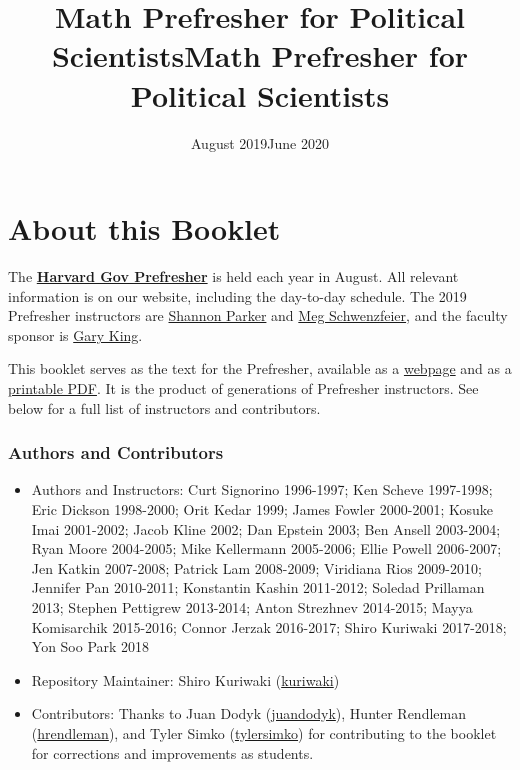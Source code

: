 \documentclass[]{book}
\title{Math Prefresher for Political Scientists}
\author{}
\date{August 2019}
\title{Math Prefresher for Political Scientists}
\author{}
\date{\vspace{-2.5em}June 2020}
\providecommand{\tightlist}{%
  \setlength{\itemsep}{0pt}\setlength{\parskip}{0pt}}
\theoremstyle{definition}
\theoremstyle{definition}
\theoremstyle{definition}
\theoremstyle{remark}
\begin{document}
\maketitle

{
\setcounter{tocdepth}{1}
\tableofcontents
}
\hypertarget{about-this-booklet}{%
\chapter*{About this Booklet}\label{about-this-booklet}}

The \href{https://projects.iq.harvard.edu/prefresher}{\textbf{Harvard Gov Prefresher}} is held each year in August. All relevant information is on our website, including the day-to-day schedule. The 2019 Prefresher instructors are \href{https://wcfia.harvard.edu/shannon-lynn-parker}{Shannon Parker} and \href{http://schwenzfeier.github.io/}{Meg Schwenzfeier}, and the faculty sponsor is \href{https://gking.harvard.edu}{Gary King}.

This booklet serves as the text for the Prefresher, available as a \href{https://iqss.github.io/prefresher/}{webpage} and as a \href{https://github.com/IQSS/prefresher/releases}{printable PDF}. It is the product of generations of Prefresher instructors. See below for a full list of instructors and contributors.

\hypertarget{authors-and-contributors}{%
\subsection*{Authors and Contributors}\label{authors-and-contributors}}

\begin{itemize}
\tightlist
\item
  Authors and Instructors: Curt Signorino 1996-1997; Ken Scheve 1997-1998; Eric Dickson 1998-2000; Orit Kedar 1999; James Fowler 2000-2001; Kosuke Imai 2001-2002; Jacob Kline 2002; Dan Epstein 2003; Ben Ansell 2003-2004; Ryan Moore 2004-2005; Mike Kellermann 2005-2006; Ellie Powell 2006-2007; Jen Katkin 2007-2008; Patrick Lam 2008-2009; Viridiana Rios 2009-2010; Jennifer Pan 2010-2011; Konstantin Kashin 2011-2012; Soledad Prillaman 2013; Stephen Pettigrew 2013-2014; Anton Strezhnev 2014-2015; Mayya Komisarchik 2015-2016; Connor Jerzak 2016-2017; Shiro Kuriwaki 2017-2018; Yon Soo Park 2018
\item
  Repository Maintainer: Shiro Kuriwaki (\href{https://github.com/kuriwaki}{kuriwaki})
\item
  Contributors: Thanks to Juan Dodyk (\href{https://github.com/juandodyk}{juandodyk}), Hunter Rendleman (\href{https://github.com/hrendleman}{hrendleman}), and Tyler Simko (\href{https://github.com/tylersimko}{tylersimko}) for contributing to the booklet for corrections and improvements as students.
\end{itemize}
\end{document}
